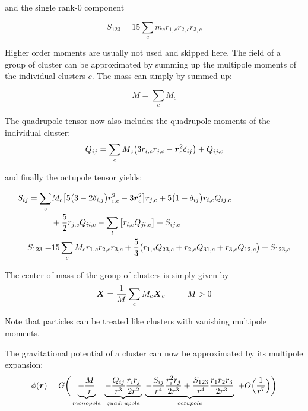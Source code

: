 and the single rank-0 component

\begin{equation}
\label{ch02_grav02_eq005}
S_{1 2 3} = 15 \sum_{c} m_c r_{1, c} r_{2, c} r_{3, c}
\end{equation}

Higher order moments are usually not used and skipped here. The field of a group of cluster can be approximated by summing up the multipole moments of the individual clusters $c$. The mass can simply by summed up:

\begin{equation}
\label{ch02_grav02_eq006}
M = \sum_{c} M_{c}
\end{equation}

The quadrupole tensor now also includes the quadrupole moments of the individual cluster:
\begin{equation}
\label{ch02_grav02_eq007}
Q_{ij} = \sum_{c} M_{c} \big( 3 r_{i, c} r_{j, c} - \boldsymbol{r}_{c}^{2} \delta_{i j} \big) + Q_{i j, c} 
\end{equation}

and finally the octupole tensor yields:

\begin{align}
\label{ch02_grav02_eq008}
S_{ij} = \sum_{c}&  M_{c} \big[ 5 \big( 3 - 2 \delta_{i,j} \big) r_{i, c}^{2} - 3 \boldsymbol{r}_{c}^2 \big] r_{j, c} 
+ 5 \big( 1 - \delta_{i j} \big) r_{i, c} Q_{i j, c} \nonumber \\
&+ \frac{5}{2} r_{j, c} Q_{i i, c} - \sum_{l} \big[ r_{l, c} Q_{j l, c} \big] + S_{i j, c} \\
S_{1 2 3} =& 15 \sum_{c} M_{c} r_{1, c} r_{2, c} r_{3, c} + \frac{5}{3} \big( r_{1, c} Q_{2 3, c} + r_{2, c} Q_{3 1, c} + r_{3, c} Q_{1 2, c} \big) + S_{1 2 3, c }
\end{align}

The center of mass of the group of clusters is simply given by 
\begin{equation}
\label{ch02_grav02_eq009}
\boldsymbol{X} = \frac{1}{M} \sum_{c} M_{c} \boldsymbol{X}_{c} ~~~~~~~~  M > 0
\end{equation}

Note that particles can be treated like clusters with vanishing multipole moments.

The gravitational potential of a cluster can now be approximated by its multipole expansion:
\begin{equation}
\label{ch02_grav02_eq010}
\phi(\boldsymbol{r}) = G \bigg(
\underbrace{ - \frac{M}{r} }_{monopole} ~ 
\underbrace{ - \frac{Q_{i j}}{r^{3}} \frac{r_{i} r_{j} }{2 r^{2} } }_{quadrupole}~ 
\underbrace{ - \frac{S_{i j}}{r^{4}} \frac{r_{i}^2 r_{j}}{2 r^{3} } + \frac{ S_{1 2 3} }{r^{4}}\frac{ r_{1} r_{2} r_{3} }{2 r^{3}} }_{octupole}~ 
+ O\Big(\frac{1}{r^{7}}\Big) \bigg)
\end{equation}

